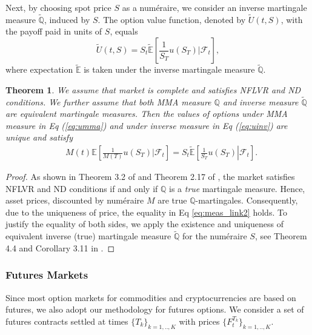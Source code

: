 \documentclass[11pt,a4paper] {article}
\newtheorem{theorem}{Theorem}[section]
\begin{document}
Next, by choosing spot price $S$ as a num\'eraire, we consider an inverse  martingale measure $\tilde{\mathbb{Q}}$, induced by $S$. The option value function, denoted by $\tilde U(t,S)$, with the payoff paid in units of $S$, equals
\begin{equation}\label{eq:uinv}
\tilde U(t,S)=S_t\tilde{\mathbb{E}}\left[\frac{1}{S_T}\left.u(S_T)\right|\mathcal{F}_{t}\right],
\end{equation}
where expectation $\tilde{\mathbb{E}}$ is taken under the inverse martingale measure $\tilde{\mathbb{Q}}$.

\begin{theorem}\label{def1} We assume that market is complete and satisfies NFLVR and ND conditions. We further assume that both MMA measure $\mathbb{Q}$ and inverse measure $\tilde{\mathbb{Q}}$ are equivalent martingale measures. Then the values of options under MMA measure in Eq (\ref{eq:umma}) and under inverse measure in Eq (\ref{eq:uinv}) are unique and satisfy
\begin{equation}\label{eq:meas_link2}
 \begin{split}
& M(t)\mathbb{E}\left[\frac{1}{M(T)}\left.u(S_T)\right|\mathcal{F}_{t}\right] = S_t\tilde{\mathbb{E}}\left[\left.\frac{1}{S_T}u(S_T)\right|\mathcal{F}_{t}\right].
\end{split}
\end{equation}
\end{theorem}
\begin{proof}
As shown in Theorem 3.2 of \cite{JarrowLarsson2012} and Theorem 2.17 of \cite{HerdegenSchweizer2018}, the market satisfies NFLVR and ND conditions if and only if $\mathbb{Q}$ is a {\it true} martingale measure. Hence, asset prices, discounted by num\'eraire $M$ are true $\mathbb{Q}$-martingales. Consequently, due to the uniqueness of price, the equality in Eq \eqref{eq:meas_link2} holds. To justify the equality of both sides, we apply the existence and uniqueness of equivalent inverse (true) martingale measure $\tilde{\mathbb{Q}}$ for the num\'eraire $S$, see Theorem 4.4 and Corollary 3.11 in \cite{HerdegenSchweizer2018}. 
\end{proof}



\subsubsection{Futures Markets}

Since most option markets for commodities and cryptocurrencies are based on futures, we also adopt our methodology for futures options. We consider a set of futures contracts settled at times $\{T_{k}\}_{k=1,..,K}$ with prices $\{F^{T_{k}}_t\}_{k=1,..,K}$.
\end{document}
